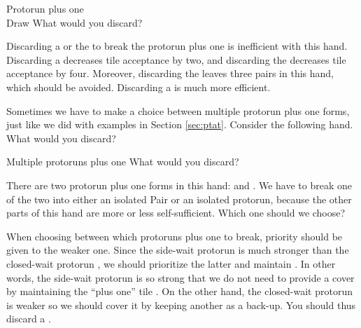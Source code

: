 \begin{itembox}[r]{Protorun plus one}
\bp
{}~\\
\hspace{290pt}\footnotesize{Draw}
\ep
\vspace{-15pt}What would you discard? \vspace{-5pt}
\end{itembox}
\noindent
Discarding a {\large{}} or the {\large{}} to break the protorun plus one {\large{}} is inefficient with this hand. Discarding a {\large{}} decreases tile acceptance by two, and discarding the {\large{}} decreases tile acceptance by four. Moreover, discarding the {\large{}} leaves three pairs in this hand, which should be avoided. Discarding a {\large{}} is much more efficient. 

\bigskip

Sometimes we have to make a choice between multiple protorun plus one forms, just like we did with examples in Section \ref{sec:ptat}. 
Consider the following hand. What would you discard?
\begin{itembox}[r]{Multiple protoruns plus one}
\bp
{}\bei\bei
\ep
\vspace{-10pt}What would you discard? \vspace{-5pt}
\end{itembox}
\noindent
There are two protorun plus one forms in this hand: {\large{}} and {\large{}}. We have to break one of the two into either an isolated Pair or an isolated protorun, because the other parts of this hand are more or less self-sufficient. Which one should we choose?

\bigskip
When choosing between which protoruns plus one to break, priority should be given to the weaker one. Since the side-wait protorun {\large{}} is much stronger than the closed-wait protorun {\large{}}, we should prioritize the latter and maintain {\large{}}. In other words, the side-wait protorun {\large{}} is so strong that we do not need to provide a cover by maintaining the ``plus one'' tile {\large{}}. On the other hand, the closed-wait protorun {\large{}} is weaker so we should cover it by keeping another {\large{}} as a back-up. You should thus discard a {\large{}}. 

